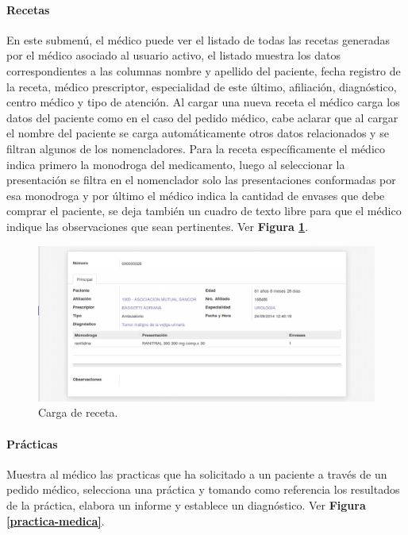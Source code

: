 \paragraph{Recetas}

En este submenú, el médico puede ver el listado de todas las recetas generadas por el médico asociado al usuario activo, el listado muestra los datos correspondientes a las columnas nombre y apellido del paciente, fecha registro de la receta, médico prescriptor, especialidad de este último, afiliación, diagnóstico, centro médico y tipo de atención. Al cargar una nueva receta el médico carga los datos del paciente como en el caso del pedido médico, cabe aclarar que al cargar el nombre del paciente se carga automáticamente otros datos relacionados y se filtran algunos de los nomencladores. Para la receta específicamente el médico indica primero la monodroga del medicamento, luego al seleccionar la presentación se filtra en el nomenclador solo las presentaciones conformadas por esa monodroga y por último el médico indica la cantidad de envases que debe comprar el paciente, se deja también un cuadro de texto libre para que el médico indique las observaciones que sean pertinentes. Ver \textbf{Figura \ref{receta}}.

\begin{figure}
      \centering
      \includegraphics[width=.8\textwidth]{img/tp1/HE/Receta}
      \caption{Carga de receta.}
      \label{receta}
\end{figure}


\paragraph{Prácticas}

Muestra al médico las practicas que ha solicitado a un paciente a través de un pedido médico, selecciona una práctica y tomando como referencia los resultados de la práctica, elabora un informe y establece un diagnóstico. Ver \textbf{Figura \ref{practica-medica}}.

